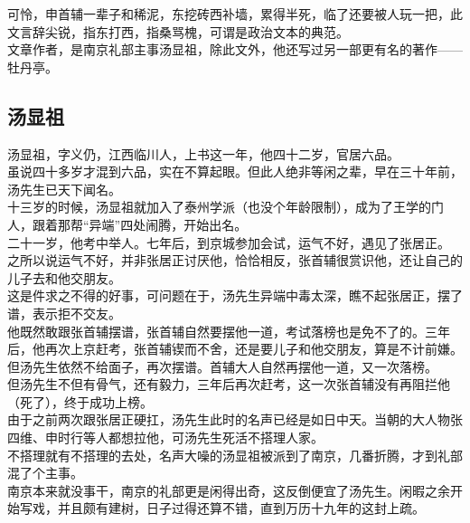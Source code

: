 \begin{multicols}{\theparacolNo}
可怜，申首辅一辈子和稀泥，东挖砖西补墙，累得半死，临了还要被人玩一把，此文言辞尖锐，指东打西，指桑骂槐，可谓是政治文本的典范。\\

文章作者，是南京礼部主事汤显祖，除此文外，他还写过另一部更有名的著作——牡丹亭。\\

\subsection{汤显祖}
汤显祖，字义仍，江西临川人，上书这一年，他四十二岁，官居六品。\\

虽说四十多岁才混到六品，实在不算起眼。但此人绝非等闲之辈，早在三十年前，汤先生已天下闻名。\\

十三岁的时候，汤显祖就加入了泰州学派（也没个年龄限制），成为了王学的门人，跟着那帮“异端”四处闹腾，开始出名。\\

二十一岁，他考中举人。七年后，到京城参加会试，运气不好，遇见了张居正。\\

之所以说运气不好，并非张居正讨厌他，恰恰相反，张首辅很赏识他，还让自己的儿子去和他交朋友。\\

这是件求之不得的好事，可问题在于，汤先生异端中毒太深，瞧不起张居正，摆了谱，表示拒不交友。\\

他既然敢跟张首辅摆谱，张首辅自然要摆他一道，考试落榜也是免不了的。三年后，他再次上京赶考，张首辅锲而不舍，还是要儿子和他交朋友，算是不计前嫌。但汤先生依然不给面子，再次摆谱。首辅大人自然再摆他一道，又一次落榜。\\

但汤先生不但有骨气，还有毅力，三年后再次赶考，这一次张首辅没有再阻拦他（死了），终于成功上榜。\\

由于之前两次跟张居正硬扛，汤先生此时的名声已经是如日中天。当朝的大人物张四维、申时行等人都想拉他，可汤先生死活不搭理人家。\\

不搭理就有不搭理的去处，名声大噪的汤显祖被派到了南京，几番折腾，才到礼部混了个主事。\\

南京本来就没事干，南京的礼部更是闲得出奇，这反倒便宜了汤先生。闲暇之余开始写戏，并且颇有建树，日子过得还算不错，直到万历十九年的这封上疏。\\


\end{multicols}
